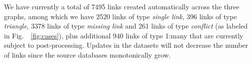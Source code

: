 We have currently a total of 7495 links created automatically across the three graphs, among which we have 2520 links of type {\it single link}, 396 links of type {\it triangle}, 3378 links  of type {\it missing link} and 261 links  of type {\it conflict} (as labeled in Fig.~~\ref{fig:cases}), plus additional 940 links of type 1:many that are currently subject to post-processing. Updates in the datasets will not decrease the number of links since the source databases monotonically grow. 


